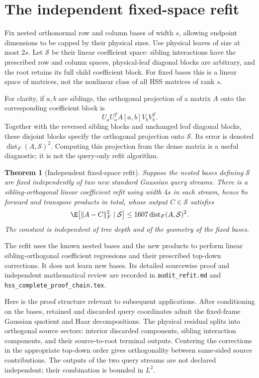 \documentclass[11pt,oneside,openany,a4paper]{book}
\numberwithin{equation}{chapter}
\newtheorem{theorem}{Theorem}[chapter]
\theoremstyle{definition}
\theoremstyle{remark}
\newcommand{\sourcefile}[1]{{\small\nolinkurl{#1}}}
\begin{document}
\section{The independent fixed-space refit}
\label{upd:sec:route-refit}

Fix nested orthonormal row and column bases of width $s$, allowing
endpoint dimensions to be capped by their physical sizes.  Use physical
leaves of size at most $2s$.  Let $\mathcal S$ be their linear coefficient
space: sibling interactions have the prescribed row and column spaces,
physical-leaf diagonal blocks are arbitrary, and the root retains its
full child coefficient block.  For fixed bases this is a linear space
of matrices, not the nonlinear class of all HSS matrices of rank $s$.

For clarity, if $a,b$ are siblings, the orthogonal projection of a
matrix $A$ onto the corresponding coefficient block is
\[
 U_aU_a^T A[a,b]V_bV_b^T.
\]
Together with the reversed sibling blocks and unchanged leaf diagonal
blocks, these disjoint blocks specify the orthogonal projection onto
$\mathcal S$.  Its error is denoted
$\operatorname{dist}_F(A,\mathcal S)^2$.  Computing this projection from
the dense matrix is a useful diagnostic; it is not the query-only refit
algorithm.

\begin{theorem}[Independent fixed-space refit]
\label{upd:thm:route-refit}
Suppose the nested bases defining $\mathcal S$ are fixed independently
of two new standard Gaussian query streams.  There is a
sibling-orthogonal linear coefficient refit using width $4s$ in each
stream, hence $8s$ forward and transpose products in total, whose output
$C\in\mathcal S$ satisfies
\begin{equation}
 \E\bigl[\lVert A-C\rVert_F^2\mid\mathcal S\bigr]
 \leq1607\operatorname{dist}_F(A,\mathcal S)^2.
 \label{upd:eq:route-refit}
\end{equation}
The constant is independent of tree depth and of the geometry of the
fixed bases.
\end{theorem}

The refit uses the known nested bases and the new products to perform
linear sibling-orthogonal coefficient regressions and their prescribed
top-down corrections.  It does not learn new bases.  Its detailed
sourcewise proof and independent mathematical review are recorded in
\sourcefile{audit_refit.md} and
\sourcefile{hss_complete_proof_chain.tex}.

Here is the proof structure relevant to subsequent applications.  After
conditioning on the bases, retained and discarded query coordinates
admit the fixed-frame Gaussian quotient and Haar decompositions.  The
physical residual splits into orthogonal source sectors: interior
discarded components, sibling interaction components, and their
source-to-root terminal outputs.  Centering the corrections in the
appropriate top-down order gives orthogonality between same-sided
source contributions.  The outputs of the two query streams are not
declared independent; their combination is bounded in $L^2$.
\end{document}
